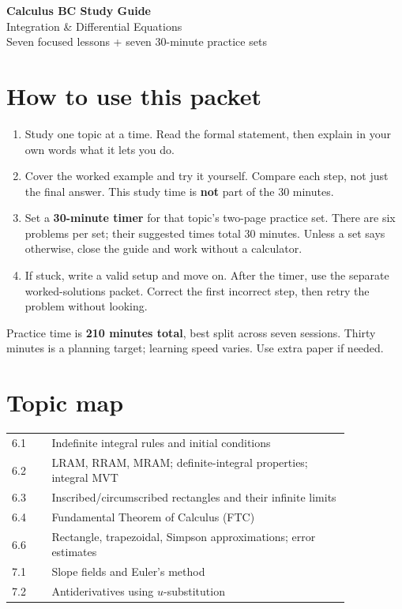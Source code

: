 \documentclass[11pt]{article}
\begin{document}
\begin{center}
{\LARGE\bfseries Calculus BC Study Guide}\\[0.4em]
{\Large Integration \& Differential Equations}\\[0.7em]
{\large Seven focused lessons + seven 30-minute practice sets}
\end{center}

\section*{How to use this packet}
\begin{enumerate}
\item Study one topic at a time. Read the formal statement, then explain in your own words what it lets you do.
\item Cover the worked example and try it yourself. Compare each step, not just the final answer. This study time is \textbf{not} part of the 30 minutes.
\item Set a \textbf{30-minute timer} for that topic's two-page practice set. There are six problems per set; their suggested times total 30 minutes. Unless a set says otherwise, close the guide and work without a calculator.
\item If stuck, write a valid setup and move on. After the timer, use the separate worked-solutions packet. Correct the first incorrect step, then retry the problem without looking.
\end{enumerate}
Practice time is \textbf{210 minutes total}, best split across seven sessions. Thirty minutes is a planning target; learning speed varies. Use extra paper if needed.

\section*{Topic map}
\begingroup
\renewcommand{\arraystretch}{1.35}
\begin{tabular}{@{}p{0.10\linewidth}p{0.75\linewidth}@{}}
6.1 & Indefinite integral rules and initial conditions\\
6.2 & LRAM, RRAM, MRAM; definite-integral properties; integral MVT\\
6.3 & Inscribed/circumscribed rectangles and their infinite limits\\
6.4 & Fundamental Theorem of Calculus (FTC)\\
6.6 & Rectangle, trapezoidal, Simpson approximations; error estimates\\
7.1 & Slope fields and Euler's method\\
7.2 & Antiderivatives using $u$-substitution
\end{tabular}
\endgroup
\end{document}
